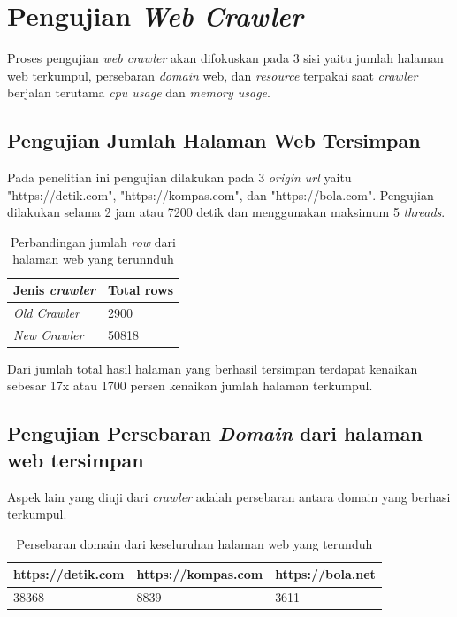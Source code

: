 \section{Pengujian \emph{Web Crawler} }

Proses pengujian \emph{web crawler} akan difokuskan pada 3 sisi yaitu jumlah halaman web terkumpul, persebaran \emph{domain} web, dan \emph{resource} terpakai saat \emph{crawler} berjalan terutama \emph{cpu usage} dan \emph{memory usage}.

\subsection{Pengujian Jumlah Halaman Web Tersimpan}

Pada penelitian ini pengujian dilakukan pada 3 \emph{origin url} yaitu "https://detik.com", "https://kompas.com", dan "https://bola.com". Pengujian dilakukan selama 2 jam atau 7200 detik dan menggunakan maksimum 5 \emph{threads}. 

\begin{table}[H]
  \caption{Perbandingan jumlah \emph{row} dari halaman web yang terunnduh}
  \begin{center}
    \begin{tabular}{ |p{5cm}|p{3cm}| } \hline
      \textbf{Jenis \emph{crawler}}& \textbf{Total rows} \\ \hline
      \emph{Old Crawler}&  2900 \\ \hline
      \emph{New Crawler}& 50818 \\ \hline
    \end{tabular}
  \end{center}
\end{table}

Dari jumlah total hasil halaman yang berhasil tersimpan terdapat kenaikan sebesar 17x atau 1700 persen kenaikan jumlah halaman terkumpul.

\subsection{Pengujian Persebaran \emph{Domain} dari halaman web tersimpan}

Aspek lain yang diuji dari \emph{crawler} adalah persebaran antara domain yang berhasi terkumpul.

\begin{table}[H]
  \caption{Persebaran domain dari keseluruhan halaman web yang terunduh}
  \begin{center}
    \begin{tabular}{ |p{3.5cm}|p{3.5cm}|p{3.5cm}| } \hline
      \textbf{https://detik.com}& \textbf{https://kompas.com}& \textbf{https://bola.net} \\ \hline
      38368& 8839& 3611 \\ \hline
    \end{tabular}
  \end{center}
\end{table}

